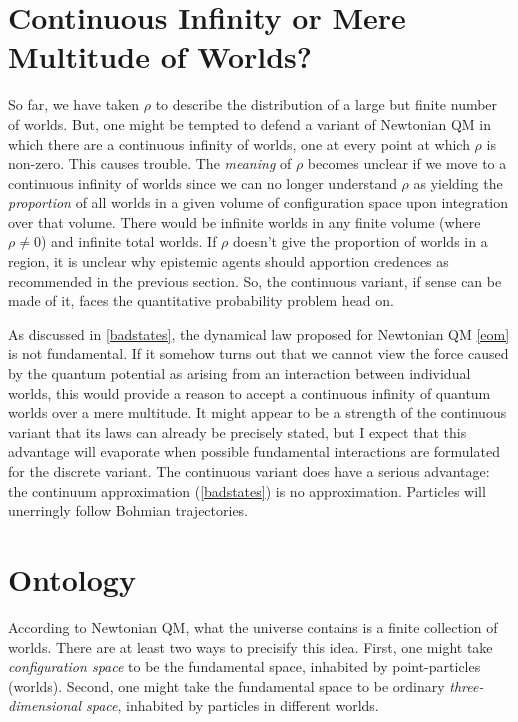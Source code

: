 \documentclass[12pt,secnumarabic,balancelastpage,amsmath,amssymb,nofootinbib]{article}
\begin{document}
\section{Continuous Infinity or Mere Multitude of Worlds?}\label{multitude}

So far, we have taken $\rho$ to describe the distribution of a large but finite number of worlds.  But, one might be tempted to defend a variant of Newtonian QM in which there are a continuous infinity of worlds, one at every point at which $\rho$ is non-zero.  This causes trouble.  The \emph{meaning} of $\rho$ becomes unclear if we move to a continuous infinity of worlds since we can no longer understand $\rho$ as yielding the \emph{proportion} of all worlds in a given volume of configuration space upon integration over that volume.  There would be infinite worlds in any finite volume (where $\rho\neq 0$) and infinite total worlds.  If $\rho$ doesn't give the proportion of worlds in a region, it is unclear why epistemic agents should apportion credences as recommended in the previous section.  So, the continuous variant, if sense can be made of it, faces the quantitative probability problem head on.

As discussed in \textsection \ref{badstates}, the dynamical law proposed for Newtonian QM \eqref{eom} is not fundamental.  If it somehow turns out that we cannot view the force caused by the quantum potential as arising from an interaction between individual worlds, this would provide a reason to accept a continuous infinity of quantum worlds over a mere multitude.  It might appear to be a strength of the continuous variant that its laws can already be precisely stated, but I expect that this advantage will evaporate when possible fundamental interactions are formulated for the discrete variant.  The continuous variant does have a serious advantage:  the continuum approximation (\textsection \ref{badstates}) is no approximation.  Particles will unerringly follow Bohmian trajectories.

\section{Ontology}\label{ontology}

According to Newtonian QM, what the universe contains is a finite collection of worlds.  There are at least two ways to precisify this idea.  First, one might take \emph{configuration space} to be the fundamental space, inhabited by point-particles (worlds).  Second, one might take the fundamental space to be ordinary \emph{three-dimensional space}, inhabited by particles in different worlds.
\end{document}
